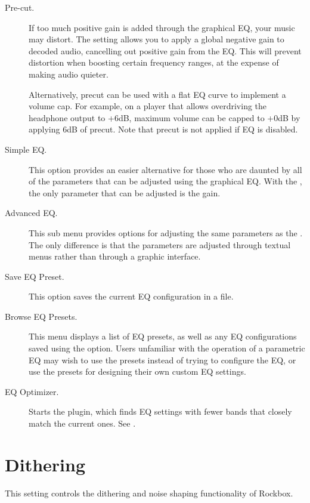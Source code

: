 \begin {description}
  \item[Pre-cut.]
  If too much positive gain is added through the graphical EQ, your music may
  distort.  The  setting allows you to apply a global negative
  gain to decoded audio, cancelling out positive gain from the EQ.  This will
  prevent distortion when boosting certain frequency ranges, at the expense of
  making audio quieter.

  Alternatively, precut can be used with a flat EQ curve to implement a volume
  cap.  For example, on a player that allows overdriving the headphone output
  to +6dB, maximum volume can be capped to +0dB by applying 6dB of precut. Note
  that precut is not applied if EQ is disabled.

\item[Simple EQ.]
This option provides an easier alternative for those who are daunted by all of
the parameters that can be adjusted using the graphical EQ. With the
, the only parameter that can be adjusted is the gain.

\item[Advanced EQ.]
This sub menu provides options for adjusting the same parameters as the
. The only difference is that the parameters are
adjusted through textual menus rather than through a graphic interface.

\item[Save EQ Preset.]
This option saves the current EQ configuration in a  file.

\item[Browse EQ Presets.]
This menu displays a list of EQ presets, as well as any EQ configurations saved
using the  option. Users unfamiliar with the
operation of a parametric EQ may wish to use the presets instead of trying to
configure the EQ, or use the presets for designing their own custom EQ
settings.

\item[EQ Optimizer.]
Starts the  plugin, which finds EQ settings with fewer
bands that closely match the current ones.  See .

\end{description}

\section{Dithering}
This setting controls the dithering and noise shaping functionality of Rockbox.

